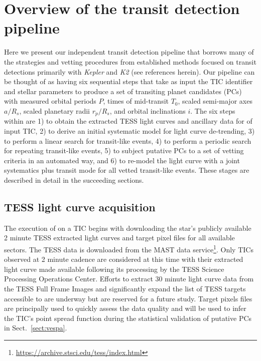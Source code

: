 \section{Overview of the \pipeline{} transit detection pipeline} \label{sect:pipe}
Here we present our independent transit detection pipeline \pipeline{} that borrows many of the strategies and
vetting procedures from established methods focused on transit detections primarily with \emph{Kepler} and
\emph{K2} (see references herein).
Our pipeline can be thought of as having six sequential steps that
take as input the TIC identifier and stellar parameters to 
produce a set of transiting planet candidates (PCs) with measured orbital periods $P$, times of mid-transit
$T_0$, scaled semi-major axes $a/R_s$, scaled planetary radii $r_p/R_s$, and orbital inclinations $i$.
The six steps within \pipeline{} are 1) to obtain the extracted TESS light curves and ancillary data for
of input TIC, 2) to derive an initial systematic model for light curve de-trending, 3) to perform a linear search
for transit-like events, 4) to perform a periodic search for repeating transit-like events, 5) to subject putative
PCs to a set of vetting criteria in an automated way, and 6) to re-model the light curve with a joint
systematics plus transit mode for all vetted transit-like events. These stages are described
in detail in the succeeding sections.

\subsection{TESS light curve acquisition}
The execution of \pipeline{} on a TIC begins with downloading the star's publicly available
2 minute TESS extracted light curves and target pixel files for all available sectors. 
The TESS data is downloaded from the MAST data service\footnote{\url{https://archive.stsci.edu/tess/index.html}}.
Only TICs observed at 2 minute cadence are considered at this time with their extracted light curve made available
following its processing by the TESS Science Processing Operations Center. Efforts to extract 30 minute light
curve data from the TESS Full Frame Images and significantly expand the list of TESS targets accessible to
\pipeline{} are underway but are reserved for a future study.
Target pixels files are principally used to quickly assess the data quality and will be used to
infer the TIC's point spread function during the statistical validation of putative PCs in Sect.~\ref{sect:vespa}. \\

